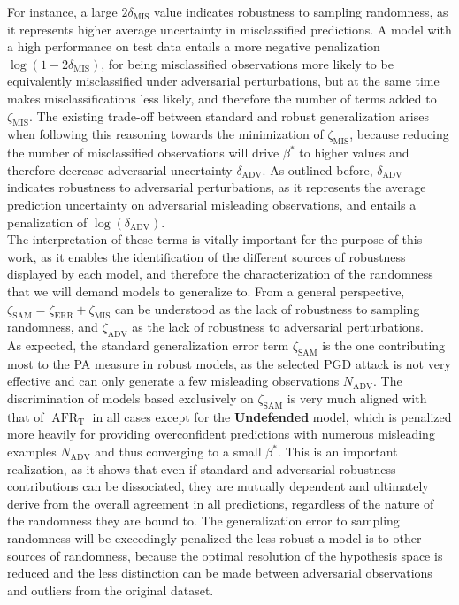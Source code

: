 For instance, a large $2 \delta_{\text{MIS}}$ value indicates robustness to sampling randomness, as it
represents higher average uncertainty in misclassified predictions. A model with a high performance on 
test data entails a more negative penalization $\log(1 - 2 \delta_{\text{MIS}})$, for being misclassified 
observations more likely to be equivalently misclassified under adversarial perturbations, but at
the same time makes misclassifications less likely, and therefore the number of terms added to
$\zeta_{\text{MIS}}$. The existing trade-off between standard and robust generalization arises when 
following this reasoning towards the minimization of $\zeta_{\text{MIS}}$, because reducing the number of 
misclassified observations will drive $\beta^{*}$ to higher values and therefore decrease adversarial 
uncertainty $\delta_{\text{ADV}}$. As outlined before, $\delta_{\text{ADV}}$ indicates 
robustness to adversarial perturbations, as it represents the average prediction uncertainty on adversarial 
misleading observations, and entails a penalization of $\log(\delta_{\text{ADV}})$. \\

The interpretation of these terms is vitally important for the purpose of this work, as it enables
the identification of the different sources of robustness displayed by each model, and therefore
the characterization of the randomness that we will demand models to generalize to. From a general 
perspective, $\zeta_{\text{SAM}} = \zeta_{\text{ERR}} + \zeta_{\text{MIS}}$ can be understood as the lack of robustness
to sampling randomness, and $\zeta_{\text{ADV}}$ as the lack of robustness to adversarial perturbations. \\

As expected, the standard generalization error term $\zeta_{\text{SAM}}$ is the one contributing most to
the PA measure in robust models, as the selected PGD attack is not very effective and can only generate
a few misleading observations $N_{\text{ADV}}$. The discrimination of models based exclusively 
on $\zeta_{\text{SAM}}$  is very much aligned with that of $\operatorname{AFR}_\text{T}$ in all cases except for the
{\color{tab:orange} \textbf{Undefended}} model, which is penalized more heavily for providing
overconfident predictions with numerous misleading examples $N_{\text{ADV}}$ and
thus converging to a small $\beta^{*}$. This is an important realization, as it shows that even if
standard and adversarial robustness contributions can be dissociated, they are mutually dependent
and ultimately derive from the overall agreement in all predictions, regardless of the nature of the
randomness they are bound to. The generalization error to sampling randomness will be exceedingly penalized
the less robust a model is to other sources of randomness, because the optimal resolution of the hypothesis
space is reduced and the less distinction can be made between adversarial observations and outliers from
the original dataset. \\

